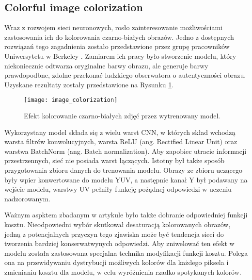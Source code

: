  \subsection{Colorful image colorization}

    Wraz z rozwojem sieci neuronowych, rosło zainteresowanie możliwościami zastosowania
    ich do kolorowania czarno-białych obrazów. Jedno z dostępnych rozwiązań tego
    zagadnienia zostało przedstawione przez grupę pracowników Uniwersytetu w
    Berkeley \cite{colorful_image_colorization}. Zamiarem ich pracy było stworzenie
    modelu, który niekoniecznie odtwarza oryginalne barwy obrazu, ale generuje
    barwy prawdopodbne, zdolne przekonać ludzkiego obserwatora o autentyczności
    obrazu. Uzyskane rezultaty zostały przedstawione na
    Rysunku \ref{fig:colorful_image_colorization}.

    \begin{figure}[h]
      \centering
      \texttt{[image: image\_colorization]}
      \caption{Efekt kolorowanie czarno-białych zdjęć przez wytrenowany model.}
      \label{fig:colorful_image_colorization}
    \end{figure}

    Wykorzystany model składa się z wielu warst CNN, w których skład wchodzą
    warsta filtrów konwolucyjnych, warsta ReLU (ang. Rectified
    Linear Unit) oraz warstwa BatchNorm (ang. Batch normalization).
    Aby zapobiec utracie informacji przestrzennych, sieć nie posiada warst łączących.
    Istotny był także sposób
    przygotowania zbioru danych do trenowania modelu. Obrazy ze zbioru uczącego
    były wpier konwertowane do modelu YUV, a następnie kanał Y był podawany na
    wejście modelu, warstwy UV pełniły funkcję pożądnej odpowiedzi w uczeniu
    nadzorowanym.

    Ważnym aspktem zbadanym w artykule było także dobranie odpowiedniej
    funkcji kosztu. Nieodpowiedni wybór skutkował desaturacją kolorowanych
    obrazów, jedną z potencjalnych przyczyn tego zjawiska może być tendencja
    sieci do tworzenia bardziej konserwatwynych odpowiedzi. Aby zniwelować ten
    efekt w modelu została zastosowana specjalna technika modyfikacji
    funkcji kosztu. Polega ona na przewidywaniu dystrybucji możliwych kolorów
    dla każdego piksela i zmienianiu kosztu dla modelu, w celu wyróżnienia rzadko
    spotykanych kolorów.

